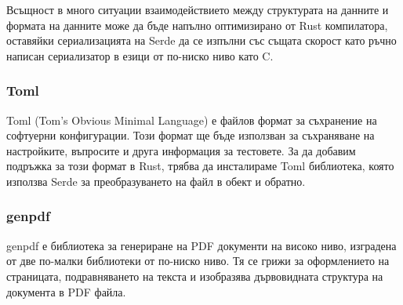 Всъщност в много ситуации взаимодействието между структурата на данните и
формата на данните може да бъде напълно оптимизирано от Rust компилатора,
оставяйки сериализацията на Serde да се изпълни със същата скорост като
ръчно написан сериализатор в езици от по-ниско ниво като C.

\subsubsection{Toml}
Toml (Tom's Obvious Minimal Language) е файлов формат за съхранение на
софтуерни конфигурации. Този формат ще бъде използван за съхраняване на
настройките, въпросите и друга информация за тестовете. За да добавим подръжка за
този формат в Rust, трябва да инсталираме Toml библиотека, която използва
Serde за преобразуването на файл в обект и обратно.


\subsubsection{genpdf}
genpdf е библиотека за генериране на PDF документи на високо ниво, изградена от
две по-малки библиотеки от по-ниско ниво. Тя се грижи за оформлението на
страницата, подравняването на текста и изобразява дървовидната структура на
документа в PDF файла.
